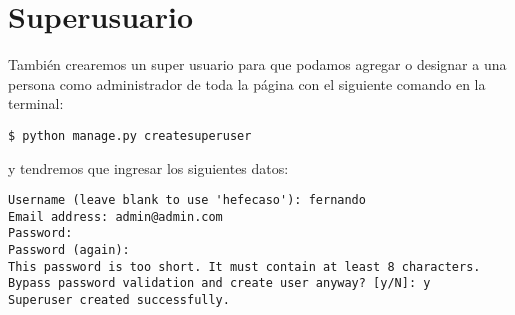 \documentclass[12pt,letterpaper]{article}
\begin{document}
\section{Superusuario}

También crearemos un super usuario para que podamos agregar o designar a una persona como administrador de toda la página con el siguiente comando en la terminal:\\

\begin{verbatim}
$ python manage.py createsuperuser
\end{verbatim}

y tendremos que ingresar los siguientes datos:\\

\begin{verbatim}
Username (leave blank to use 'hefecaso'): fernando
Email address: admin@admin.com
Password:
Password (again):
This password is too short. It must contain at least 8 characters.
Bypass password validation and create user anyway? [y/N]: y
Superuser created successfully.
\end{verbatim}
\end{document}
